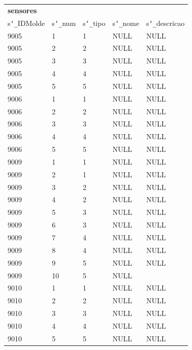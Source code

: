\documentclass[11pt,twoside,a4paper]{report}
\begin{document}
\begin{table}[H]
	\centering
	\begin{tabular}{|l|l|l|l|l|}
		\multicolumn{5}{l}{\textbf{sensores}}\\ \cline{1-5}
		s\texttt{\char`_}IDMolde & s\texttt{\char`_}num & s\texttt{\char`_}tipo & s\texttt{\char`_}nome & s\texttt{\char`_}descricao\\ \cline{1-5}
		9005 & 1 & 1 & NULL & NULL\\ \cline{1-5}
		9005 & 2 & 2 & NULL & NULL\\ \cline{1-5}
		9005 & 3 & 3 & NULL & NULL\\ \cline{1-5}
		9005 & 4 & 4 & NULL & NULL\\ \cline{1-5}
		9005 & 5 & 5 & NULL & NULL\\ \cline{1-5}
		9006 & 1 & 1 & NULL & NULL\\ \cline{1-5}
		9006 & 2 & 2 & NULL & NULL\\ \cline{1-5}
		9006 & 3 & 3 & NULL & NULL\\ \cline{1-5}
		9006 & 4 & 4 & NULL & NULL\\ \cline{1-5}
		9006 & 5 & 5 & NULL & NULL\\ \cline{1-5}
		9009 & 1 & 1 & NULL & NULL\\ \cline{1-5}
		9009 & 2 & 1 & NULL & NULL\\ \cline{1-5}
		9009 & 3 & 2 & NULL & NULL\\ \cline{1-5}
		9009 & 4 & 2 & NULL & NULL\\ \cline{1-5}
		9009 & 5 & 3 & NULL & NULL\\ \cline{1-5}
		9009 & 6 & 3 & NULL & NULL\\ \cline{1-5}
		9009 & 7 & 4 & NULL & NULL\\ \cline{1-5}
		9009 & 8 & 4 & NULL & NULL\\ \cline{1-5}
		9009 & 9 & 5 & NULL & NULL\\ \cline{1-5}
		9009 & 10 & 5 & NULL & \\ \cline{1-5}
		9010 & 1 & 1 & NULL & NULL\\ \cline{1-5}
		9010 & 2 & 2 & NULL & NULL\\ \cline{1-5}
		9010 & 3 & 3 & NULL & NULL\\ \cline{1-5}
		9010 & 4 & 4 & NULL & NULL\\ \cline{1-5}
		9010 & 5 & 5 & NULL & NULL\\ \cline{1-5}

\end{tabular}
\end{table}
\end{document}
